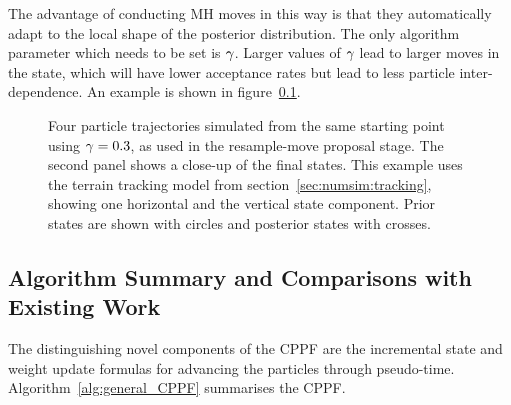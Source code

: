 \documentclass{article}
\begin{document}
The advantage of conducting MH moves in this way is that they automatically adapt to the local shape of the posterior distribution. The only algorithm parameter which needs to be set is $\gamma$. Larger values of $\gamma$ lead to larger moves in the state, which will have lower acceptance rates but lead to less particle inter-dependence. An example is shown in figure~\ref{}.
%
\begin{figure}
\centering
{}
\caption{Four particle trajectories simulated from the same starting point using $\gamma=0.3$, as used in the resample-move proposal stage. The second panel shows a close-up of the final states. This example uses the terrain tracking model from section~\ref{sec:numsim:tracking}, showing one horizontal and the vertical state component. Prior states are shown with circles and posterior states with crosses.}
\label{fig:drone_example_frame_deterministic}
\end{figure}



\subsection{Algorithm Summary and Comparisons with Existing Work}

The distinguishing novel components of the CPPF are the incremental state and weight update formulas for advancing the particles through pseudo-time. Algorithm~\ref{alg:general_CPPF} summarises the CPPF.
\end{document}
